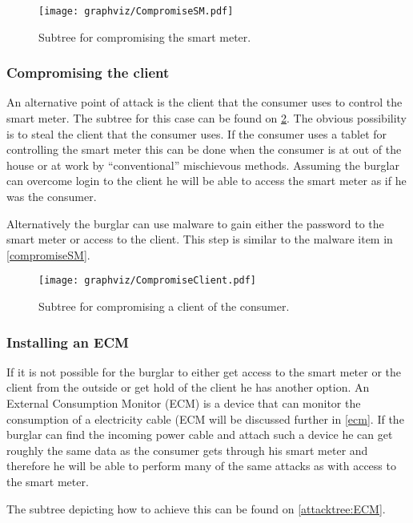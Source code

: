 \begin{figure}[H]
\center
\texttt{[image: graphviz/CompromiseSM.pdf]}
\caption{Subtree for compromising the smart meter.}
\label{attacktree:compromiseSM}
\end{figure}


\subsubsection{Compromising the client}\label{compromise:client}
An alternative point of attack is the client that the consumer uses to control the smart meter.
The subtree for this case can be found on \cref{attacktree:compromiseClient}.
The obvious possibility is to steal the client that the consumer uses.
If the consumer uses a tablet for controlling the smart meter this can be done when the consumer is at out of the house or at work by ``conventional'' mischievous methods.
Assuming the burglar can overcome login to the client he will be able to access the smart meter as if he was the consumer.

Alternatively the burglar can use malware to gain either the password to the smart meter or access to the client.
This step is similar to the malware item in \cref{compromiseSM}.

\begin{figure}[H]
\center
\texttt{[image: graphviz/CompromiseClient.pdf]}
\caption{Subtree for compromising a client of the consumer.}
\label{attacktree:compromiseClient}
\end{figure}

\subsubsection{Installing an ECM} \label{compromise:ecm}
If it is not possible for the burglar to either get access to the smart meter or the client from the outside or get hold of the client he has another option.
An External Consumption Monitor (ECM) is a device that can monitor the consumption of a electricity cable (ECM will be discussed further in \cref{ecm}.
If the burglar can find the incoming power cable and attach such a device he can get roughly the same data as the consumer gets through his smart meter and therefore he will be able to perform many of the same attacks as with access to the smart meter.

The subtree depicting how to achieve this can be found on \cref{attacktree:ECM}.


